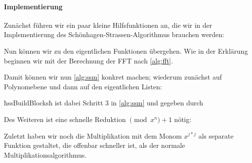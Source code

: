 \paragraph{Implementierung}
Zunächst führen wir ein paar kleine Hilfsfunktionen an, die wir in der
Implementierung des Schönhagen-Strassen-Algorithmus brauchen werden:

Nun können wir zu den eigentlichen Funktionen übergehen.
Wie in der Erklärung beginnen wir mit der Berechnung der FFT nach 
\autoref{alg:fft}.

Damit können wir nun \autoref{alg:ssm} konkret machen; wiederum zunächst auf
Polynomebene und dann auf den eigentlichen Listen:

ħssBuildBlocksħ ist dabei Schritt 3 in \autoref{alg:ssm} und gegeben durch

Des Weiteren ist eine schnelle Reduktion $\pmod x^n+1$ nötig:

Zuletzt haben wir noch die Multiplikation mit dem Monom $x^{j*j}$ als separate
Funktion gestaltet, die offenbar schneller ist, als der normale
Multiplikationsalgorithmus.




